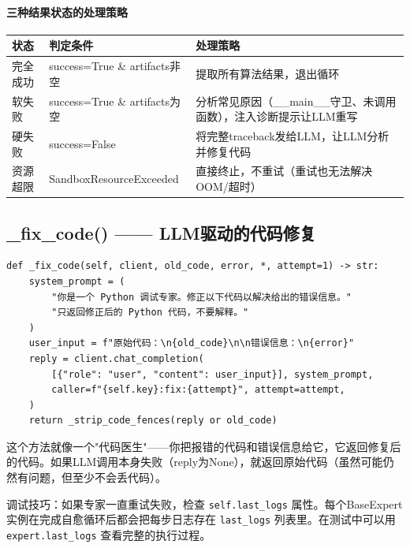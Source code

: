 \documentclass[11pt,a4paper]{ctexbook}
\begin{document}
\paragraph{三种结果状态的处理策略}

\begin{longtable}{p{3cm} p{3cm} p{7cm}}
    \toprule
    \textbf{状态} & \textbf{判定条件} & \textbf{处理策略} \\
    \midrule
    完全成功 & success=True \& artifacts非空 & 提取所有算法结果，退出循环 \\
    \midrule
    软失败 & success=True \& artifacts为空 & 分析常见原因（\_\_main\_\_守卫、未调用函数），注入诊断提示让LLM重写 \\
    \midrule
    硬失败 & success=False & 将完整traceback发给LLM，让LLM分析并修复代码 \\
    \midrule
    资源超限 & SandboxResourceExceeded & 直接终止，不重试（重试也无法解决OOM/超时） \\
    \bottomrule
\end{longtable}

\subsection{\_fix\_code() —— LLM驱动的代码修复}

\begin{verbatim}
def _fix_code(self, client, old_code, error, *, attempt=1) -> str:
    system_prompt = (
        "你是一个 Python 调试专家。修正以下代码以解决给出的错误信息。"
        "只返回修正后的 Python 代码，不要解释。"
    )
    user_input = f"原始代码：\n{old_code}\n\n错误信息：\n{error}"
    reply = client.chat_completion(
        [{"role": "user", "content": user_input}], system_prompt,
        caller=f"{self.key}:fix:{attempt}", attempt=attempt,
    )
    return _strip_code_fences(reply or old_code)
\end{verbatim}

\begin{plainbox}
    这个方法就像一个"代码医生"——你把报错的代码和错误信息给它，它返回修复后的代码。如果LLM调用本身失败（reply为None），就返回原始代码（虽然可能仍然有问题，但至少不会丢代码）。
\end{plainbox}

\begin{tipbox}
    调试技巧：如果专家一直重试失败，检查 \texttt{self.last\_logs} 属性。每个BaseExpert实例在完成自愈循环后都会把每步日志存在 \texttt{last\_logs} 列表里。在测试中可以用 \texttt{expert.last\_logs} 查看完整的执行过程。
\end{tipbox}
\end{document}
